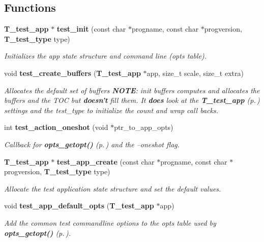 \subsection*{Functions}
\begin{CompactItemize}
\item 
{\bf T\_\-test\_\-app} $\ast$ {\bf test\_\-init} (const char $\ast$progname, const char $\ast$progversion, {\bf T\_\-test\_\-type} type)
\begin{CompactList}\small\item\em Initializes the app state structure and command line (opts table).\item\end{CompactList}\item 
void {\bf test\_\-create\_\-buffers} ({\bf T\_\-test\_\-app} $\ast$app, size\_\-t scale, size\_\-t extra)
\begin{CompactList}\small\item\em Allocates the default set of buffers {\bf NOTE}: init buffers computes and allocates the buffers and the TOC but {\bf doesn't} fill them. It {\bf does} look at the {\bf T\_\-test\_\-app} {\rm (p.\,\pageref{structT__test__app})} settings and the test\_\-type to initialize the count and wrap call backs.\item\end{CompactList}\item 
int {\bf test\_\-action\_\-oneshot} (void $\ast$ptr\_\-to\_\-app\_\-opts)
\begin{CompactList}\small\item\em Callback for {\bf opts\_\-getopt()} {\rm (p.\,\pageref{group__opts_a3})} and the --oneshot flag.\item\end{CompactList}\item 
{\bf T\_\-test\_\-app} $\ast$ {\bf test\_\-app\_\-create} (const char $\ast$progname, const char $\ast$progversion, {\bf T\_\-test\_\-type} type)
\begin{CompactList}\small\item\em Allocate the test application state structure and set the default values.\item\end{CompactList}\item 
void {\bf test\_\-app\_\-default\_\-opts} ({\bf T\_\-test\_\-app} $\ast$app)
\begin{CompactList}\small\item\em Add the common test commandline options to the opts table used by {\bf opts\_\-getopt()} {\rm (p.\,\pageref{group__opts_a3})}.\item\end{CompactList}\item 

\end{CompactItemize}
